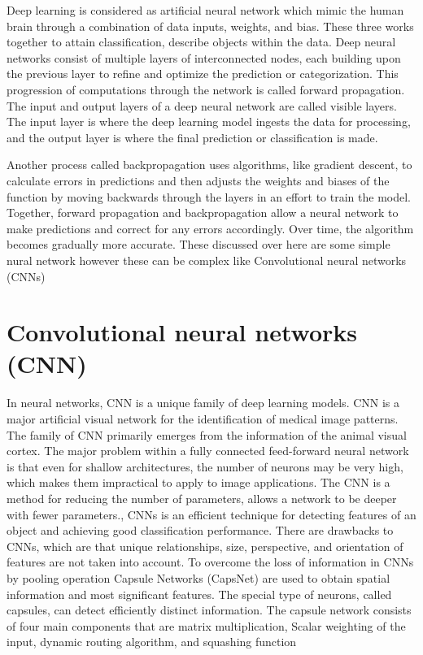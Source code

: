\documentclass{article,17 pt}
\begin{document}
Deep learning is considered as artificial neural network which mimic the human brain through a combination of data inputs, weights, and bias. These three works together to attain classification, describe objects within the data. Deep neural networks consist of multiple layers of interconnected nodes, each building upon the previous layer to refine and optimize the prediction or categorization. This progression of computations through the network is called forward propagation. The input and output layers of a deep neural network are called visible layers. The input layer is where the deep learning model ingests the data for processing, and the output layer is where the final prediction or classification is made. 

Another process called backpropagation uses algorithms, like gradient descent, to calculate errors in predictions and then adjusts the weights and biases of the function by moving backwards through the layers in an effort to train the model. Together, forward propagation and backpropagation allow a neural network to make predictions and correct for any errors accordingly. Over time, the algorithm becomes gradually more accurate. These discussed over here are some simple nural network however these can be complex like Convolutional neural networks (CNNs) 


\section*{Convolutional neural networks (CNN)} 


In neural networks, CNN is a unique family of deep learning models. CNN is a major artificial visual network for the identification of medical image patterns. The family of CNN primarily emerges from the information of the animal visual cortex. The major problem within a fully connected feed-forward neural network is that even for shallow architectures, the number of neurons may be very high, which makes them impractical to apply to image applications. The CNN is a method for reducing the number of parameters, allows a network to be deeper with fewer parameters., CNNs is an efficient technique for detecting features of an object and achieving good classification performance. There are drawbacks to CNNs, which are that unique relationships, size, perspective, and orientation of features are not taken into account. To overcome the loss of information in CNNs by pooling operation Capsule Networks (CapsNet) are used to obtain spatial information and most significant features. The special type of neurons, called capsules, can detect efficiently distinct information. The capsule network consists of four main components that are matrix multiplication, Scalar weighting of the input, dynamic routing algorithm, and squashing function 
\end{document}
